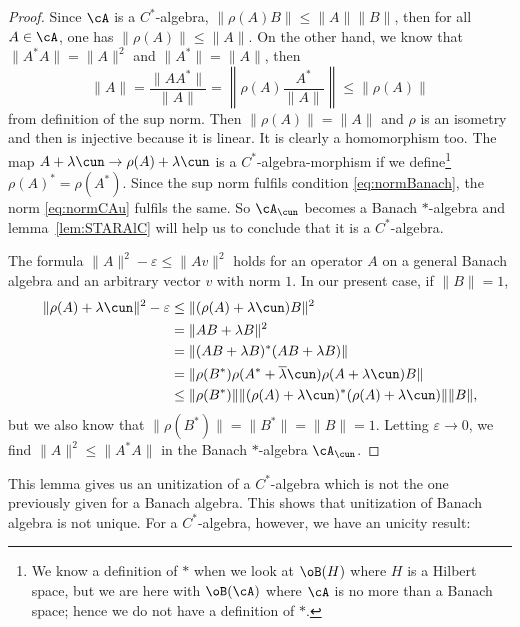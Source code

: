 \begin{proof}
Since $\cA$ is a $C^*$-algebra, $\|\rho(A)B\|\leq\| A \|\|B\|$, then for all $A\in \cA$, one has $\| \rho(A) \|\leq \| A \|$. On the other hand, we know that $\| A^*A \|=\| A \|^2$ and $\| A^* \|=\| A \|$, then
\[
\| A \|=\frac{\| AA^* \|}{\| A \|}=\left\|  \rho(A)\frac{A^*}{\| A \|}  \right\|\leq\| \rho(A) \|
\]
from definition of the sup norm. Then $\| \rho(A) \|=\| A \|$ and $\rho$ is an isometry and then is injective because it is linear. It is clearly a homomorphism too. The map $A+\lambda\cun\to\rho(A)+\lambda\cun$ is a $C^*$-algebra-morphism if we define\footnote{We know a definition of $*$ when we look at $\oB(H)$ where $H$ is a Hilbert space, but we are here with $\oB(\cA)$ where $\cA$ is no more than a Banach space; hence we do not have a definition of $*$.} $\rho(A)^*=\rho(A^*)$.  Since the sup norm fulfils condition \eqref{eq:normBanach}, the norm \eqref{eq:normCAu} fulfils the same. So $\cA_{\cun}$ becomes a Banach $*$-algebra and lemma~\ref{lem:STARAlC} will help us to conclude that it is a $C^*$-algebra.

The formula $\| A \|^2-\varepsilon\leq\| Av \|^2$ holds for an operator $A$ on a general Banach algebra and an arbitrary vector $v$ with norm $1$. In our present case, if $\| B \|=1$,
\begin{equation}
\begin{split}
  \| \rho(A)+\lambda\cun \|^2-\varepsilon
        &\leq \| (\rho(A)+\lambda\cun)B \|^2\\
        &    =\| AB+\lambda B \|^2\\
        &    =\| (AB+\lambda B)^*(AB+\lambda B) \|\\
        &    =\| \rho(B^*)\rho(A^*+\overline{\lambda}\cun)\rho(A+\lambda\cun)B \|\\
        &\leq \| \rho(B^*) \|\| (\rho(A)+\lambda\cun)^*(\rho(A)+\lambda\cun) \|\| B \|,
\end{split}
\end{equation}
but we also know that $\| \rho(B^*) \|=\| B^* \|=\| B \|=1$. Letting $\varepsilon\to 0$, we find $\| A \|^2\leq\| A^*A \|$ in the Banach $*$-algebra $\cA_{\cun}$.

\end{proof}

\label{pg:unit_nonunic} This lemma gives us an unitization of a $C^*$-algebra which is not the one previously given for a Banach algebra. This shows that unitization of Banach algebra is not unique. For a $C^*$-algebra, however, we have an unicity result:

